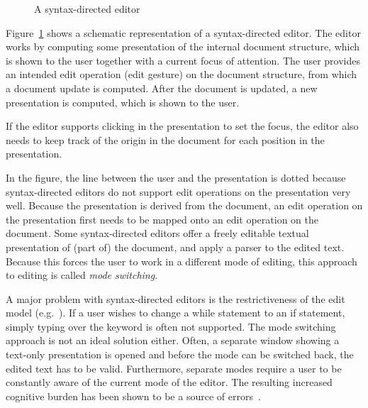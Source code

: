 \begin{figure}
\begin{small}
\begin{center}
\begin{center}
\begin{small}
\noindent {}
\end{small}
\end{center}\caption{A syntax-directed editor}\label{synDirEdit} 
\end{center}
\end{small}
\end{figure}


Figure~\ref{synDirEdit} shows a schematic representation of a syntax-directed editor. The editor works by computing some presentation of the internal document structure, which is shown to the user together with a current focus of attention. The user provides an intended edit operation (edit gesture) on the document structure, from which a document update is computed. After the document is updated, a new presentation is computed, which is shown to the user.

If the editor supports clicking in the presentation to set the focus, the editor also needs to keep track of the origin in the document for each position in the presentation.

In the figure, the line between the user and the presentation is dotted because syntax-directed editors do not support edit operations on the presentation very well. Because the presentation is derived from the document, an edit operation on the presentation first needs to be mapped onto an edit operation on the document. Some syntax-directed editors offer a freely editable textual presentation of (part of) the document, and apply a parser to the edited text. Because this forces the user to work in a different mode of editing, this approach to editing is called {\em mode switching}.

A major problem with syntax-directed editors is the restrictiveness of the edit model (e.g.~\cite{vanter94practical,rubinNeal87design}). If a user wishes to change a while statement to an if statement, simply typing over the keyword is often not supported. The mode switching approach is not an ideal solution either. Often, a separate window showing a text-only presentation is opened and before the mode can be switched back, the edited text has to be valid. Furthermore, separate modes require a user to be constantly aware of the current mode of the editor. The resulting increased cognitive burden has been shown to be a source of errors~\cite{sellen90modes}.

